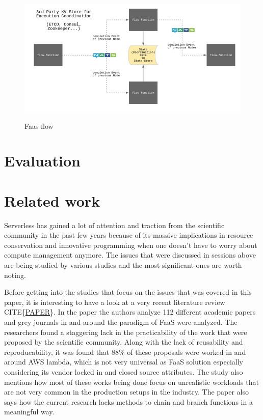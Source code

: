 \documentclass[12pt,titlepage]{article}
\begin{document}
\begin{figure}[!h]
    \caption{Faas flow}
    \centering
    \includegraphics[width=130mm]{./thesis_images/faas-flow.png}
    \label{fig:faas-flow}
\end{figure}
\section{Evaluation}
\label{sec:orgb79338b}
\section{Related work}
\label{sec:org41d0736}
Serverless has gained a lot of attention and traction from the scientific
community in the past few years because of its massive implications in resource
conservation and innovative programming when one doesn't have to worry about
compute management anymore. The issues that were discussed in sessions above are
being studied by various studies and the most significant ones are worth noting.

Before getting into the studies that focus on the issues that was covered in
this paper, it is interesting to have a look at  a very recent literature review
CITE\{\href{https://arxiv.org/pdf/2004.03276.pdf}{PAPER}\}. In the paper the authors analyze 112 different academic papers
and grey journals in
and around the paradigm of FaaS were analyzed. The researchers found a
staggering lack in the practicability of the work that were proposed by the
scientific community. Along with the lack of reusability and reproducability, it
was found that 88\% of these proposals were worked in and around AWS lambda,
which is not very universal as FaaS solution especially considering its vendor
locked in and closed source attributes. The study also mentions how most of
these works being done focus on unrealistic workloads that are not very common
in the production setups in the industry. The paper also says how the current
research lacks methods to chain and branch functions in a meaningful way.
\end{document}

